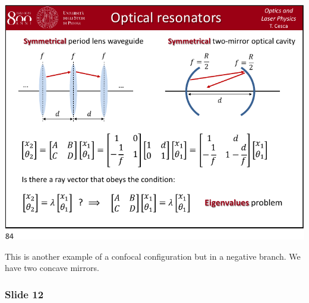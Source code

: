 \documentclass[../main/main.tex]{subfiles}
\begin{document}
\begin{minipage}[]{0.5\linewidth}
\centering
\includegraphics[page=11,width=1\textwidth]{../lessons/pdf_file/21_lecture.pdf}
\end{minipage}
\hspace{0.3cm}\vspace{0.3cm}
\begin{minipage}[c]{0.47\linewidth}

This is another example of a confocal configuration but in a negative branch. We have two concave mirrors.

\end{minipage}

\subsubsection*{Slide 12}
\end{document}
